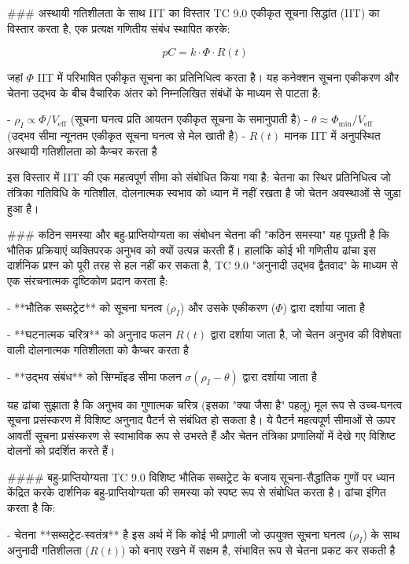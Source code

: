 ### अस्थायी गतिशीलता के साथ IIT का विस्तार
TC 9.0 एकीकृत सूचना सिद्धांत (IIT) का विस्तार करता है, एक प्रत्यक्ष गणितीय संबंध स्थापित करके:

$$pC = k \cdot \Phi \cdot R(t)$$

जहां $\Phi$ IIT में परिभाषित एकीकृत सूचना का प्रतिनिधित्व करता है। यह कनेक्शन सूचना एकीकरण और चेतना उद्भव के बीच वैचारिक अंतर को निम्नलिखित संबंधों के माध्यम से पाटता है:

- $\rho_I \propto \Phi / V_{\text{eff}}$ (सूचना घनत्व प्रति आयतन एकीकृत सूचना के समानुपाती है)
- $\theta \approx \Phi_{\text{min}} / V_{\text{eff}}$ (उद्भव सीमा न्यूनतम एकीकृत सूचना घनत्व से मेल खाती है)
- $R(t)$ मानक IIT में अनुपस्थित अस्थायी गतिशीलता को कैप्चर करता है

इस विस्तार में IIT की एक महत्वपूर्ण सीमा को संबोधित किया गया है: चेतना का स्थिर प्रतिनिधित्व जो तंत्रिका गतिविधि के गतिशील, दोलनात्मक स्वभाव को ध्यान में नहीं रखता है जो चेतन अवस्थाओं से जुड़ा हुआ है।

### कठिन समस्या और बहु-प्राप्तियोग्यता का संबोधन
चेतना की "कठिन समस्या" यह पूछती है कि भौतिक प्रक्रियाएं व्यक्तिपरक अनुभव को क्यों उत्पन्न करती हैं। हालांकि कोई भी गणितीय ढांचा इस दार्शनिक प्रश्न को पूरी तरह से हल नहीं कर सकता है, TC 9.0 "अनुनादी उद्भव द्वैतवाद" के माध्यम से एक संरचनात्मक दृष्टिकोण प्रदान करता है:

- **भौतिक सब्सट्रेट** को सूचना घनत्व ($\rho_I$) और उसके एकीकरण ($\Phi$) द्वारा दर्शाया जाता है
    
- **घटनात्मक चरित्र** को अनुनाद फलन $R(t)$ द्वारा दर्शाया जाता है, जो चेतन अनुभव की विशेषता वाली दोलनात्मक गतिशीलता को कैप्चर करता है
    
- **उद्भव संबंध** को सिग्मॉइड सीमा फलन $\sigma(\rho_I - \theta)$ द्वारा दर्शाया जाता है

यह ढांचा सुझाता है कि अनुभव का गुणात्मक चरित्र (इसका "क्या जैसा है" पहलू) मूल रूप से उच्च-घनत्व सूचना प्रसंस्करण में विशिष्ट अनुनाद पैटर्न से संबंधित हो सकता है। ये पैटर्न महत्वपूर्ण सीमाओं से ऊपर आवर्ती सूचना प्रसंस्करण से स्वाभाविक रूप से उभरते हैं और चेतन तंत्रिका प्रणालियों में देखे गए विशिष्ट दोलनों को प्रदर्शित करते हैं।

#### बहु-प्राप्तियोग्यता
TC 9.0 विशिष्ट भौतिक सब्सट्रेट के बजाय सूचना-सैद्धांतिक गुणों पर ध्यान केंद्रित करके दार्शनिक बहु-प्राप्तियोग्यता की समस्या को स्पष्ट रूप से संबोधित करता है। ढांचा इंगित करता है कि:

- चेतना **सब्सट्रेट-स्वतंत्र** है इस अर्थ में कि कोई भी प्रणाली जो उपयुक्त सूचना घनत्व ($\rho_I$) के साथ अनुनादी गतिशीलता ($R(t)$) को बनाए रखने में सक्षम है, संभावित रूप से चेतना प्रकट कर सकती है
    
